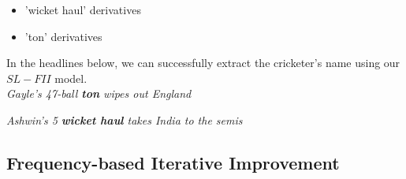 \documentclass{article}
\begin{document}
\begin{itemize}
\item 'wicket haul' derivatives
\item 'ton' derivatives
\end{itemize}

In the headlines below, we can successfully extract the cricketer's name using our $SL-FII$ model.\\

\textit{Gayle's 47-ball \textbf{ton} wipes out England }

\textit{Ashwin's 5 \textbf{wicket haul} takes India to the semis}


\subsection{Frequency-based Iterative Improvement}
\end{document}
